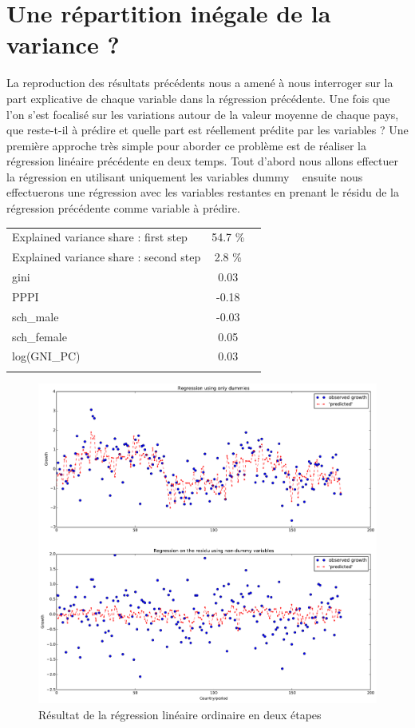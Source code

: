 \documentclass[11pt,a4paper]{article}
\begin{document}
\section{Une répartition inégale de la variance ?}

La reproduction des résultats précédents nous a amené à nous interroger sur la part explicative de chaque variable dans la régression précédente. Une fois que l'on s'est focalisé sur les variations autour de la valeur moyenne de chaque pays, que reste-t-il à prédire et quelle part est réellement prédite par les variables ? Une première approche très simple pour aborder ce problème est de réaliser la régression linéaire précédente en deux temps. Tout d'abord nous allons effectuer la régression en utilisant uniquement les variables \og dummy \fg~ ensuite nous effectuerons une régression avec les variables restantes en prenant le résidu de la régression précédente comme variable à prédire. 

\begin{center}
\begin{tabular}{ l c r }
Explained variance share : first step &  54.7 \% \\
Explained variance share : second step &  2.8 \% \\
gini     &    0.03 \\
PPPI      &  -0.18 \\
sch_male   & -0.03 \\
sch_female &  0.05 \\
log(GNI_PC) &  0.03 \\
\label{OLS_coef}
\end{tabular}
\end{center}


\begin{figure}
  \centering
  \includegraphics[width=1.\linewidth]{two_steps_OLS.pdf}
\caption{Résultat de la régression linéaire ordinaire en deux étapes}
\label{2s_OLS_graph}
\end{figure}
\end{document}
